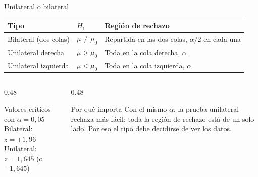 \documentclass[aspectratio=169,10pt]{beamer}
\begin{document}
\begin{frame}{Unilateral o bilateral}
  \footnotesize
  \begin{center}
  \begin{tabular}{@{}llp{5.6cm}@{}}
    \toprule
    \textbf{Tipo} & \textbf{$H_1$} & \textbf{Región de rechazo} \\
    \midrule
    Bilateral (dos colas) & $\mu\neq\mu_0$ &
      Repartida en las dos colas, $\alpha/2$ en cada una \\
    Unilateral derecha & $\mu>\mu_0$ & Toda en la cola derecha, $\alpha$ \\
    Unilateral izquierda & $\mu<\mu_0$ & Toda en la cola izquierda, $\alpha$ \\
    \bottomrule
  \end{tabular}
  \end{center}

  \vspace{0.2cm}
  \begin{columns}[T,onlytextwidth]
    \begin{column}{0.48\textwidth}
      \begin{exampleblock}{Valores críticos con $\alpha=0{,}05$}
        \footnotesize
        \centering
        Bilateral: $z=\pm 1{,}96$ \\
        Unilateral: $z=1{,}645$ (o $-1{,}645$)
      \end{exampleblock}
    \end{column}
    \begin{column}{0.48\textwidth}
      \begin{alertblock}{Por qué importa}
        \footnotesize
        Con el mismo $\alpha$, la prueba unilateral rechaza más fácil: toda la
        región de rechazo está de un solo lado. Por eso el tipo debe decidirse
         de ver los datos.
      \end{alertblock}
    \end{column}
  \end{columns}
\end{frame}
\end{document}
